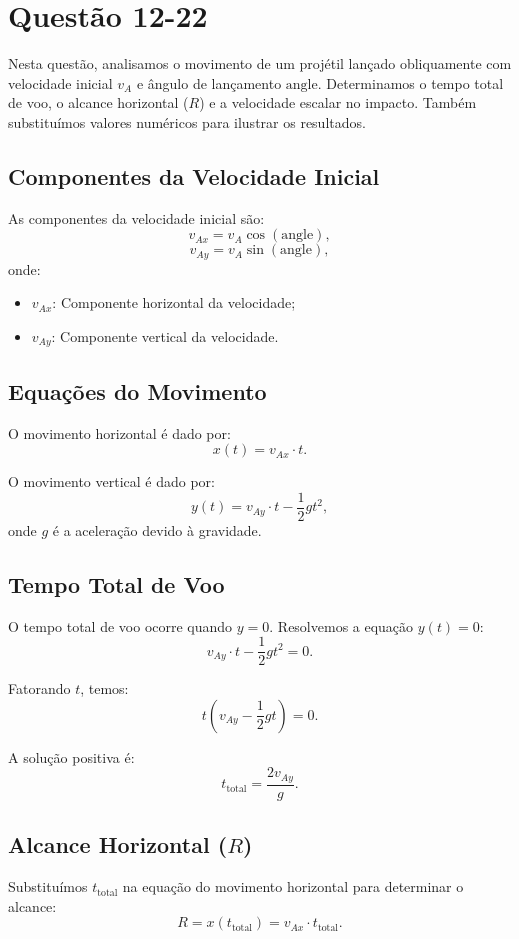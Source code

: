 \section{Questão 12-22}

Nesta questão, analisamos o movimento de um projétil lançado obliquamente com velocidade inicial \(v_A\) e ângulo de lançamento \(\text{angle}\). Determinamos o tempo total de voo, o alcance horizontal (\(R\)) e a velocidade escalar no impacto. Também substituímos valores numéricos para ilustrar os resultados.

\subsection*{Componentes da Velocidade Inicial}
As componentes da velocidade inicial são:
\[
v_{Ax} = v_A \cos(\text{angle}),
\]
\[
v_{Ay} = v_A \sin(\text{angle}),
\]
onde:
\begin{itemize}
    \item \(v_{Ax}\): Componente horizontal da velocidade;
    \item \(v_{Ay}\): Componente vertical da velocidade.
\end{itemize}

\subsection*{Equações do Movimento}
O movimento horizontal é dado por:
\[
x(t) = v_{Ax} \cdot t.
\]

O movimento vertical é dado por:
\[
y(t) = v_{Ay} \cdot t - \frac{1}{2} g t^2,
\]
onde \(g\) é a aceleração devido à gravidade.

\subsection*{Tempo Total de Voo}
O tempo total de voo ocorre quando \(y = 0\). Resolvemos a equação \(y(t) = 0\):
\[
v_{Ay} \cdot t - \frac{1}{2} g t^2 = 0.
\]

Fatorando \(t\), temos:
\[
t \left( v_{Ay} - \frac{1}{2} g t \right) = 0.
\]

A solução positiva é:
\[
t_{\text{total}} = \frac{2 v_{Ay}}{g}.
\]

\subsection*{Alcance Horizontal (\(R\))}
Substituímos \(t_{\text{total}}\) na equação do movimento horizontal para determinar o alcance:
\[
R = x(t_{\text{total}}) = v_{Ax} \cdot t_{\text{total}}.
\]


